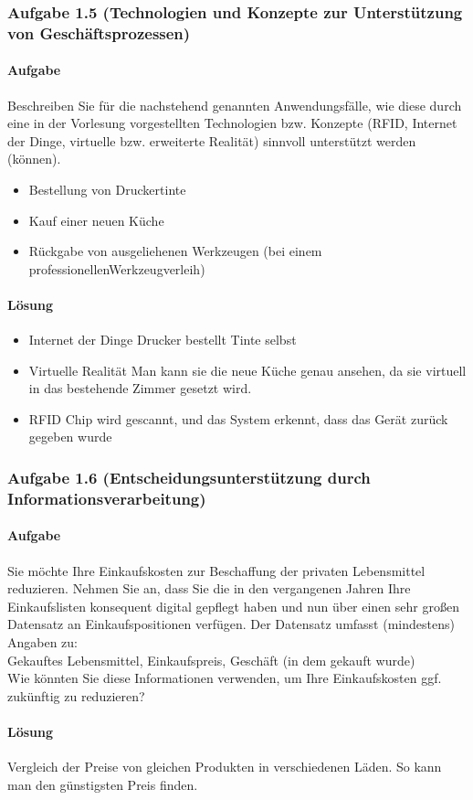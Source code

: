 \subsubsection*{Aufgabe 1.5 (Technologien und Konzepte zur Unterstützung von Geschäftsprozessen)}
\paragraph*{Aufgabe}
    Beschreiben Sie für die nachstehend genannten Anwendungsfälle, wie diese durch eine in der Vorlesung vorgestellten Technologien bzw. Konzepte (RFID, Internet der Dinge, virtuelle bzw. erweiterte Realität) sinnvoll unterstützt werden (können).
    \begin{itemize}
        \item Bestellung von Druckertinte
        \item Kauf einer neuen Küche
        \item Rückgabe von ausgeliehenen Werkzeugen (bei einem professionellenWerkzeugverleih)
    \end{itemize}
\paragraph*{Lösung}
    \begin{itemize}
        \item Internet der Dinge \textrightarrow Drucker bestellt Tinte selbst
        \item Virtuelle Realität \textrightarrow Man kann sie die neue Küche genau ansehen, da sie virtuell in das bestehende Zimmer gesetzt wird.
        \item RFID \textrightarrow Chip wird gescannt, und das System erkennt, dass das Gerät zurück gegeben wurde
    \end{itemize}

\subsubsection*{Aufgabe 1.6 (Entscheidungsunterstützung durch Informationsverarbeitung)}
\paragraph*{Aufgabe}
    Sie möchte Ihre Einkaufskosten zur Beschaffung der privaten Lebensmittel reduzieren. Nehmen Sie an, dass Sie die in den vergangenen Jahren Ihre Einkaufslisten konsequent digital gepflegt haben und nun über einen sehr großen Datensatz an Einkaufspositionen verfügen. Der Datensatz umfasst (mindestens) Angaben zu: \\
    Gekauftes Lebensmittel, Einkaufspreis, Geschäft (in dem gekauft wurde) \\
    Wie könnten Sie diese Informationen verwenden, um Ihre Einkaufskosten ggf. zukünftig zu reduzieren?
\paragraph*{Lösung}
    Vergleich der Preise von gleichen Produkten in verschiedenen Läden. So kann man den günstigsten Preis finden.




